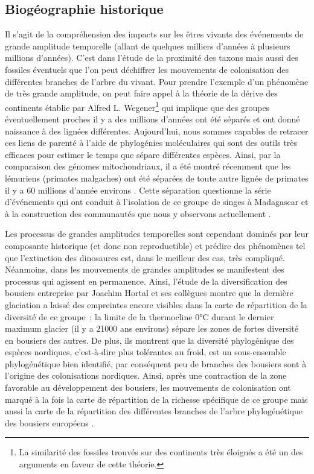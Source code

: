 \subsection*{Biogéographie
historique}\label{bioguxe9ographie-historique}

Il s'agit de la compréhension des impacts sur les êtres vivants des
événements de grande amplitude temporelle (allant de quelques milliers
d'années à plusieurs millions d'années). C'est dans l'étude de la
proximité des taxons mais aussi des fossiles éventuels que l'on peut
déchiffrer les mouvements de colonisation des différentes branches de
l'arbre du vivant. Pour prendre l'exemple d'un phénomène de très grande
amplitude, on peut faire appel à la théorie de la dérive des continents
établie par Alfred L. Wegener\footnote{La similarité des fossiles
  trouvés sur des continents très éloignés a été un des arguments en
  faveur de cette théorie.} qui implique que des groupes éventuellement
proches il y a des millions d'années ont été séparés et ont donné
naissance à des lignées différentes. Aujourd'hui, nous sommes capables
de retracer ces liens de parenté à l'aide de phylogénies moléculaires
qui sont des outils très efficaces pour estimer le temps que sépare
différentes espèces. Ainsi, par la comparaison des génomes
mitochondriaux, il a été montré récemment que les lémuriens (primates
malgaches) ont été séparées de toute autre lignée de primates il y a 60
millions d'année environs \citep{Finstermeier2013}. Cette séparation
questionne la série d'événements qui ont conduit à l'isolation de ce
groupe de singes à Madagascar et à la construction des communautés que
nous y observons actuellement \citep{Razafindratsima2013}.

Les processus de grandes amplitudes temporelles sont cependant dominés
par leur composante historique (et donc non reproductible) et prédire
des phénomènes tel que l'extinction des dinosaures est, dans le meilleur
des cas, très compliqué. Néanmoins, dans les mouvements de grandes
amplitudes se manifestent des processus qui agissent en permanence.
Ainsi, l'étude de la diversification des bousiers entreprise par Joachim
Hortal et ses collègues \citep{Hortal2011} montre que la dernière
glaciation a laissé des empreintes encore visibles dans la carte de
répartition de la diversité de ce groupe~: la limite de la thermocline
0°C durant le dernier maximum glacier (il y a 21000 ans environs) sépare
les zones de fortes diversité en bousiers des autres. De plus, ils
montrent que la diversité phylogénique des espèces nordiques,
c'est-à-dire plus tolérantes au froid, est un sous-ensemble
phylogénétique bien identifié, par conséquent peu de branches des
bousiers sont à l'origine des colonisations nordiques. Ainsi, après une
contraction de la zone favorable au développement des bousiers, les
mouvements de colonisation ont marqué à la fois la carte de répartition
de la richesse spécifique de ce groupe mais aussi la carte de la
répartition des différentes branches de l'arbre phylogénétique des
bousiers européens \citep{Hortal2011}.

